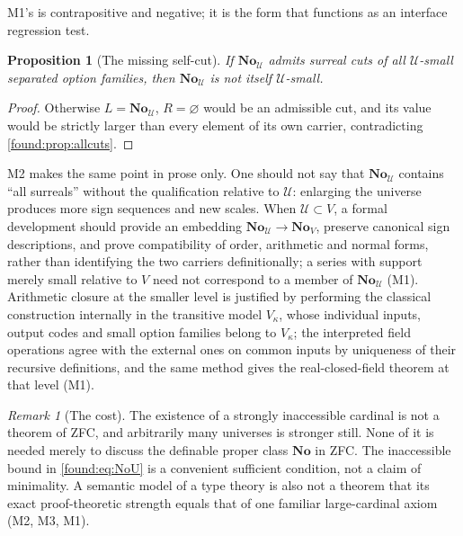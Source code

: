 \documentclass[11pt,letterpaper]{article}
\numberwithin{equation}{section}
\newtheorem{proposition}[theorem]{Proposition}
\theoremstyle{definition}
\theoremstyle{remark}
\newtheorem{remark}[theorem]{Remark}
\newcommand{\No}{\mathbf{No}}
\newcommand{\U}{\mathcal U}
\begin{document}
M1's is contrapositive and negative; it is the form that functions as an
interface regression test.

\begin{proposition}[The missing self-cut]\label{found:prop:universecut}
If $\No_\U$ admits surreal cuts of all $\U$-small separated option families,
then $\No_\U$ is not itself $\U$-small.
\end{proposition}
\begin{proof}
Otherwise $L=\No_\U$, $R=\varnothing$ would be an admissible cut, and its value
would be strictly larger than every element of its own carrier, contradicting
\cref{found:prop:allcuts}.
\end{proof}

M2 makes the same point in prose only. One should not say that $\No_\U$ contains
``all surreals'' without the qualification relative to $\U$: enlarging the
universe produces more sign sequences and new scales. When $\U\subset V$, a
formal development should provide an embedding $\No_\U\to\No_V$, preserve
canonical sign descriptions, and prove compatibility of order, arithmetic and
normal forms, rather than identifying the two carriers definitionally; a series
with support merely small relative to $V$ need not correspond to a member of
$\No_\U$ (M1). Arithmetic closure at the smaller level is justified by
performing the classical construction internally in the transitive model
$V_\kappa$, whose individual inputs, output codes and small option families
belong to $V_\kappa$; the interpreted field operations agree with the external
ones on common inputs by uniqueness of their recursive definitions, and the
same method gives the real-closed-field theorem at that level (M1).

\begin{remark}[The cost]\label{found:rem:universecost}
The existence of a strongly inaccessible cardinal is not a theorem of ZFC, and
arbitrarily many universes is stronger still. None of it is needed merely to
discuss the definable proper class $\No$ in ZFC. The inaccessible bound in
\eqref{found:eq:NoU} is a convenient sufficient condition, not a claim of
minimality. A semantic model of a type theory is also not a theorem that its
exact proof-theoretic strength equals that of one familiar large-cardinal
axiom (M2, M3, M1).
\end{remark}
\end{document}
